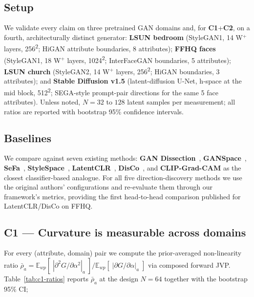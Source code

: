 
\subsection{Setup}\label{sec:exp-setup}
We validate every claim on three pretrained GAN domains and, for
\textbf{C1}+\textbf{C2}, on a fourth, architecturally distinct
generator:
\textbf{LSUN bedroom} (StyleGAN1, 14 W$^+$ layers, 256\textsuperscript{2};
HiGAN attribute boundaries, 8 attributes);
\textbf{FFHQ faces} (StyleGAN1, 18 W$^+$ layers, 1024\textsuperscript{2};
InterFaceGAN boundaries, 5 attributes);
\textbf{LSUN church} (StyleGAN2, 14 W$^+$ layers, 256\textsuperscript{2};
HiGAN boundaries, 3 attributes); and
\textbf{Stable Diffusion v1.5} (latent-diffusion U-Net, h-space at the
mid block, 512\textsuperscript{2}; SEGA-style prompt-pair directions
for the same 5 face attributes).
Unless noted, $N = 32$ to $128$ latent samples per measurement; all
ratios are reported with bootstrap 95\% confidence intervals.

\subsection{Baselines}\label{sec:exp-baselines}
We compare against seven existing methods:
\textbf{GAN Dissection}~\cite{Bau2019GANDissection},
\textbf{GANSpace}~\cite{Harkonen2020GANSpace},
\textbf{SeFa}~\cite{Shen2021SeFa},
\textbf{StyleSpace}~\cite{Wu2021StyleSpace},
\textbf{LatentCLR}~\cite{Yuksel2021LatentCLR},
\textbf{DisCo}~\cite{Ren2022DisCo}, and
\textbf{CLIP-Grad-CAM} as the closest classifier-based analogue.
For all five direction-discovery methods we use the original
authors' configurations and re-evaluate them through our framework's
metrics, providing the first head-to-head comparison published for
LatentCLR/DisCo on FFHQ.

\subsection{C1 --- Curvature is measurable across domains}
\label{sec:exp-c1}

For every (attribute, domain) pair we compute the prior-averaged
non-linearity ratio
$\bar\rho_a = \mathbb{E}_{wp}[\;|\partial^2 G/\partial\alpha^2|_a\;]
            / \mathbb{E}_{wp}[\;|\partial G/\partial\alpha|_a\;]$
via composed forward JVP. Table~\ref{tab:c1-ratios} reports
$\bar\rho_a$ at the design $N=64$ together with the bootstrap 95\% CI;

